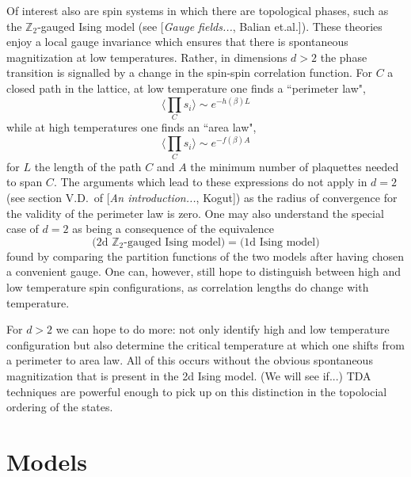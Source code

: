 \documentclass[11pt]{article}
\begin{document}
Of interest also are spin systems in which there are topological phases, such as the $\mathbb{Z}_2$-gauged Ising model (see [\textit{Gauge fields...}, Balian et.al.]). These theories enjoy a local gauge invariance which ensures that there is spontaneous magnitization at low temperatures. Rather, in dimensions $d>2$ the phase transition is signalled by a change in the spin-spin correlation function. For $C$ a closed path in the lattice, at low temperature one finds a ``perimeter law",
\begin{equation}
    \langle\prod_C s_i\rangle \sim e^{-h(\beta)L}
\end{equation}
while at high temperatures one finds an ``area law",
\begin{equation}
    \langle\prod_C s_i\rangle \sim e^{-f(\beta)A}
\end{equation}
for $L$ the length of the path $C$ and $A$ the minimum number of plaquettes needed to span $C$. The arguments which lead to these expressions do not apply in $d=2$ (see section V.D.~of [\textit{An introduction...}, Kogut]) as the radius of convergence for the validity of the perimeter law is zero. One may also understand the special case of $d=2$ as being a consequence of the equivalence
\begin{equation}
    \Big(\text{2d }\mathbb{Z}_2\text{-gauged Ising model}\Big) = \Big( \text{1d Ising model} \Big)
\end{equation}
found by comparing the partition functions of the two models after having chosen a convenient gauge. One can, however, still hope to distinguish between high and low temperature spin configurations, as correlation lengths do change with temperature.

For $d>2$ we can hope to do more: not only identify high and low temperature configuration but also determine the critical temperature at which one shifts from a perimeter to area law. All of this occurs without the obvious spontaneous magnitization that is present in the 2d Ising model. (We will see if...) TDA techniques are powerful enough to pick up on this distinction in the topolocial ordering of the states.

\section{Models}
\end{document}

